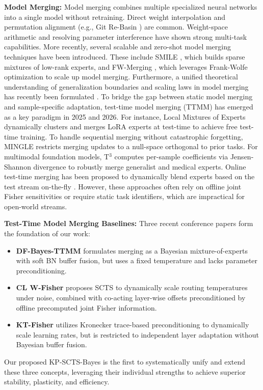 \documentclass{article}
\theoremstyle{plain}
\theoremstyle{definition}
\theoremstyle{remark}
\begin{document}
\textbf{Model Merging:} Model merging combines multiple specialized neural networks into a single model without retraining. Direct weight interpolation \cite{wortsman2022robust} and permutation alignment (e.g., Git Re-Basin \cite{ainsworth2022git}) are common. Weight-space arithmetic \cite{ilharco2022editing} and resolving parameter interference \cite{yadav2023ties} have shown strong multi-task capabilities. More recently, several scalable and zero-shot model merging techniques have been introduced. These include SMILE \cite{smile2024}, which builds sparse mixtures of low-rank experts, and FW-Merging \cite{fwmerging2025}, which leverages Frank-Wolfe optimization to scale up model merging. Furthermore, a unified theoretical understanding of generalization boundaries and scaling laws in model merging has recently been formulated \cite{unifiedgeneralization2026}. To bridge the gap between static model merging and sample-specific adaptation, test-time model merging (TTMM) has emerged as a key paradigm in 2025 and 2026. For instance, Local Mixtures of Experts \cite{localmoe2025} dynamically clusters and merges LoRA experts at test-time to achieve free test-time training. To handle sequential merging without catastrophic forgetting, MINGLE \cite{mingle2025} restricts merging updates to a null-space orthogonal to prior tasks. For multimodal foundation models, T$^3$ \cite{t3vlm2026} computes per-sample coefficients via Jensen-Shannon divergence to robustly merge generalist and medical experts. Online test-time merging has been proposed to dynamically blend experts based on the test stream on-the-fly \cite{matena2021merging, yadav2023ties}. However, these approaches often rely on offline joint Fisher sensitivities or require static task identifiers, which are impractical for open-world streams.

\textbf{Test-Time Model Merging Baselines:} Three recent conference papers form the foundation of our work:
\begin{itemize}
    \item \textbf{DF-Bayes-TTMM} \cite{bayes2026} formulates merging as a Bayesian mixture-of-experts with soft BN buffer fusion, but uses a fixed temperature and lacks parameter preconditioning.
    \item \textbf{CL W-Fisher} \cite{clw2026} proposes SCTS to dynamically scale routing temperatures under noise, combined with co-acting layer-wise offsets preconditioned by offline precomputed joint Fisher information.
    \item \textbf{KT-Fisher} \cite{ktf2026} utilizes Kronecker trace-based preconditioning to dynamically scale learning rates, but is restricted to independent layer adaptation without Bayesian buffer fusion.
\end{itemize}
Our proposed KP-SCTS-Bayes is the first to systematically unify and extend these three concepts, leveraging their individual strengths to achieve superior stability, plasticity, and efficiency.
\end{document}
